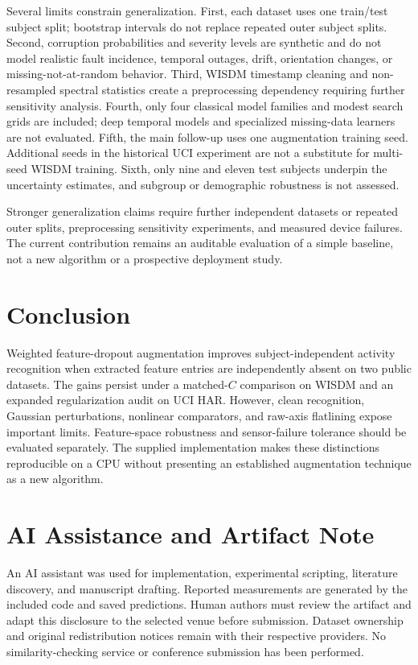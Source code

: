 \documentclass[conference]{IEEEtran}
\begin{document}
Several limits constrain generalization. First, each dataset uses one train/test subject split; bootstrap intervals do not replace repeated outer subject splits. Second, corruption probabilities and severity levels are synthetic and do not model realistic fault incidence, temporal outages, drift, orientation changes, or missing-not-at-random behavior. Third, WISDM timestamp cleaning and non-resampled spectral statistics create a preprocessing dependency requiring further sensitivity analysis. Fourth, only four classical model families and modest search grids are included; deep temporal models and specialized missing-data learners are not evaluated. Fifth, the main follow-up uses one augmentation training seed. Additional seeds in the historical UCI experiment are not a substitute for multi-seed WISDM training. Sixth, only nine and eleven test subjects underpin the uncertainty estimates, and subgroup or demographic robustness is not assessed.

Stronger generalization claims require further independent datasets or repeated outer splits, preprocessing sensitivity experiments, and measured device failures. The current contribution remains an auditable evaluation of a simple baseline, not a new algorithm or a prospective deployment study.

\section{Conclusion}
Weighted feature-dropout augmentation improves subject-independent activity recognition when extracted feature entries are independently absent on two public datasets. The gains persist under a matched-$C$ comparison on WISDM and an expanded regularization audit on UCI HAR. However, clean recognition, Gaussian perturbations, nonlinear comparators, and raw-axis flatlining expose important limits. Feature-space robustness and sensor-failure tolerance should be evaluated separately. The supplied implementation makes these distinctions reproducible on a CPU without presenting an established augmentation technique as a new algorithm.

\section*{AI Assistance and Artifact Note}
An AI assistant was used for implementation, experimental scripting, literature discovery, and manuscript drafting. Reported measurements are generated by the included code and saved predictions. Human authors must review the artifact and adapt this disclosure to the selected venue before submission. Dataset ownership and original redistribution notices remain with their respective providers. No similarity-checking service or conference submission has been performed.



\end{document}
